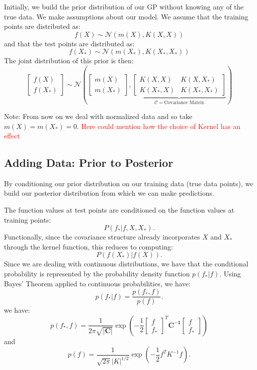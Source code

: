 \documentclass{article}
\begin{document}
Initially, we build the prior distribution of our GP without knowing any of the true data. We make assumptions about our model. We assume that the training points are distributed as:
\[
f(X) \sim \mathcal{N}(m(X), K(X, X))
\]
\noindent
and that the test points are distributed as:
\[
f(X_*) \sim \mathcal{N}(m(X_*), K(X_*, X_*))
\]
\noindent
The joint distribution of this prior is then:
\[
\begin{bmatrix}
f(X) \\
f(X_*)
\end{bmatrix}
\sim \mathcal{N} \left(
\begin{bmatrix}
m(X) \\
m(X_*)
\end{bmatrix},
\underbrace{
\begin{bmatrix}
K(X, X) & K(X, X_*) \\
K(X_*, X) & K(X_*, X_*)
\end{bmatrix}
}_{\mathcal{C} = \text{Covariance Matrix}}
\right)
\]
\noindent

\noindent
Note: From now on we deal with normalized data and so take $m(X) = m(X_*) = 0$.
\textcolor{red}{Here could mention how the choice of Kernel has an effect}



\subsection{Adding Data: Prior to Posterior}
\label{sec: priortoposterior}
By conditioning our prior distribution on our training data (true data points), we build our posterior distribution from which we can make predictions. 

\noindent
The function values at test points are conditioned on the function values at training points:
\[
P(f_* | f, X, X_*).
\]
\noindent
Functionally, since the covariance structure already incorporates $X$ and $X_*$ through the kernel function, this reduces to computing:
\[
P(f(X_*) | f(X)).
\]
\noindent
Since we are dealing with continuous distributions, we have that the conditional probability is represented by the probability density function
$
p(f_* | f).
$
Using Bayes' Theorem applied to continuous probabilities, we have:
\[
p(f_* | f) = \frac{p(f_*, f)}{p(f)}.
\]
we have:
$$p(f_*,f) = \frac{1}{2\pi\sqrt{\mathbf{|C|}}}\exp \left(-\frac{1}{2} 
\begin{bmatrix} f \\ f_*  \end{bmatrix}^T\mathbf{C^{-1}}\begin{bmatrix} f  \\ f_* \end{bmatrix}\right)$$
and 
\[
p(f) = \frac{1}{\sqrt{2\pi} |K|^{1/2}}
\exp \left(-\frac{1}{2} f^T K^{-1} f \right).
\]
\end{document}
